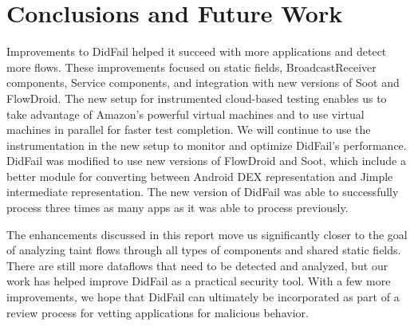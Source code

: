 \chapter{Conclusions and Future Work}
Improvements to DidFail helped it succeed with more applications and detect more flows. 
These improvements focused on static fields, BroadcastReceiver components, Service components, and integration with new versions of Soot and FlowDroid.
 The new setup for instrumented cloud-based testing enables us to take advantage of Amazon's powerful virtual machines and to use virtual machines in parallel for faster test completion. We will continue to use the instrumentation in the new setup to monitor and optimize DidFail's performance. DidFail was modified to use new versions of FlowDroid and Soot, which include a better module for converting between Android DEX representation and Jimple intermediate representation. The new version of DidFail was able to successfully process three times as many apps as it was able to process previously.
 
The enhancements discussed in this report move us significantly closer to the goal of analyzing taint flows through all types of components and shared static fields. There are still more dataflows that need to be detected and analyzed, but our work has helped improve DidFail as a practical security tool. 
 With a few more improvements, we hope that DidFail can ultimately be incorporated as part of a review process for vetting applications for malicious behavior. 




%



